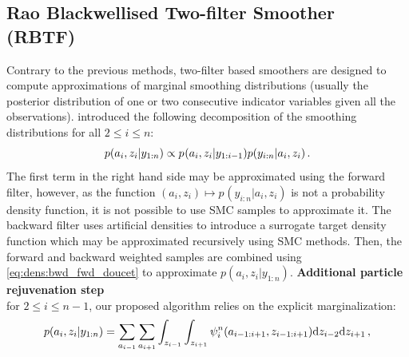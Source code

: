 \subsection{Rao Blackwellised Two-filter Smoother (RBTF)}
\label{sec:two-filer}
Contrary to the previous methods, two-filter based smoothers are designed to compute approximations of marginal smoothing distributions (usually the posterior distribution of one or two consecutive  indicator variables given all the observations). \cite{briers:doucet:maskell:2010} introduced the following decomposition of the smoothing distributions for all $2\le i \le n$:
\begin{equation}
\label{eq:dens:bwd_fwd_doucet}
p(a_{i},z_{i}|y_{1:n})  \propto  p_{}(a_{i},z_{i}|y_{1:i-1})p(y_{i:n}|a_i,z_i)\,.
\end{equation}
The first term in the right hand side may be approximated using the forward filter, however, as the function $(a_{i},z_{i})\mapsto p_{}(y_{i:n}|a_{i},z_{i})$ is not a probability density function, it is not possible to use SMC samples to approximate it. The backward filter uses artificial densities to introduce a surrogate target density function which may be approximated recursively using SMC methods. Then, the forward and backward weighted samples are combined using \eqref{eq:dens:bwd_fwd_doucet} to approximate $p(a_{i},z_{i}|y_{1:n})$. %
\textbf{Additional particle rejuvenation step}\\
for $2\le i \le n-1$, our proposed algorithm relies on the explicit marginalization:
\begin{equation}
\label{eq:dens:bwd_fwd}
p(a_{i},z_{i}|y_{1:n})  =  \sum_{a_{i-1}}\sum_{a_{i+1}} \int_{z_{i-1}} \int_{z_{i+1}} \psi^n_{i}(a_{i-1:i+1},z_{i-1:i+1})\mathrm{d} z_{i-2}\mathrm{d} z_{i+1}\,,
\end{equation}
